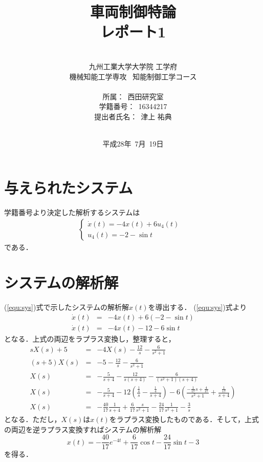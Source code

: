 \documentclass[a4paper,12pt]{jarticle}
\title{車両制御特論 \\
レポート1\\
}
\author{\vspace{40mm}\\
九州工業大学大学院 \hspace{0mm} 工学府\\
機械知能工学専攻\ \hspace{0mm} 知能制御工学コース \\
\vspace{5mm}\\
所属：\ 西田研究室\\
学籍番号：\ 16344217\\
提出者氏名：\ 津上 \hspace{0mm} 祐典\\\vspace{5mm}\\ }
\date{平成28年\ 7月\ 19日}
\begin{document}
\titlepage
\maketitle
\thispagestyle{empty}

\newpage
\section{与えられたシステム}
学籍番号より決定した解析するシステムは
\begin{eqnarray}\label{equ:sys}
 \begin{cases}
  \dot{x}(t) = -4x(t) + 6u_{4}(t)  \\
  u_{4}(t) = -2-\sin t &
 \end{cases}
\end{eqnarray}
である．
%
\section{システムの解析解}
(\ref{equ:sys})式で示したシステムの解析解$x(t)$を導出する．
(\ref{equ:sys})式より
%
\begin{eqnarray}
 \dot{x}(t) &=& -4x(t) + 6(-2-\sin t) \\
 \dot{x}(t) &=& -4x(t) -12 -6\sin t
\end{eqnarray}
%
となる．上式の両辺をラプラス変換し，整理すると，
%
\begin{eqnarray}
 sX(s) + 5 & = & -4X(s) - \frac{12}{s} - \frac{6}{s^2 + 1} \\
 (s+5)X(s) & = & -5 - \frac{12}{s} - \frac{6}{s^2 + 1} \\
 X(s) & = & -\frac{5}{s+4} - \frac{12}{s(s+4)} - \frac{6}{(s^2 + 1)(s+4)} \\
 X(s) & = & -\frac{5}{s+4} - 12 (\frac{\frac{1}{4}}{s} -
  \frac{\frac{1}{4}}{s+4}) -6(\frac{-\frac{1}{17}s+\frac{4}{17}}{s^2 +
  1}+\frac{\frac{1}{17}}{s+4}) \\
 X(s) & = & -\frac{40}{17}\frac{1}{s+4} + \frac{6}{17}\frac{s}{s^2 + 1}
  -\frac{24}{17}\frac{1}{s^2 + 1} -\frac{3}{s}
 \end{eqnarray}
となる．ただし，$X(s)$は$x(t)$をラプラス変換したものである．そして，上式
の両辺を逆ラプラス変換すればシステムの解析解
%
\begin{equation}
 x(t)  =  -\frac{40}{17}e^{-4t} + \frac{6}{17}\cos t -\frac{24}{17}\sin t -3
\end{equation}
%
を得る．
\end{document}
